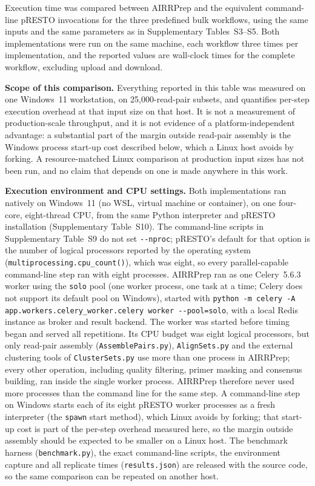 \documentclass[11pt]{article}
\begin{document}
Execution time was compared between AIRRPrep and the equivalent command-line
pRESTO invocations for the three predefined bulk workflows, using the same
inputs and the same parameters as in Supplementary Tables~S3--S5. Both
implementations were run on the same machine, each workflow three times per
implementation, and the reported values are wall-clock times for the complete
workflow, excluding upload and download.

\textbf{Scope of this comparison.} Everything reported in this table was
measured on one Windows~11 workstation, on 25,000-read-pair subsets, and
quantifies per-step execution overhead at that input size on that host. It is
not a measurement of production-scale throughput, and it is not evidence of a
platform-independent advantage: a substantial part of the margin outside
read-pair assembly is the Windows process start-up cost described below, which
a Linux host avoids by forking. A resource-matched Linux comparison at
production input sizes has not been run, and no claim that depends on one is
made anywhere in this work.

\textbf{Execution environment and CPU settings.} Both implementations ran
natively on Windows~11 (no WSL, virtual machine or container), on one
four-core, eight-thread CPU, from the same Python interpreter and pRESTO
installation (Supplementary Table~S10). The command-line scripts in
Supplementary Table~S9 do not set \texttt{-{}-nproc}; pRESTO's default for that
option is the number of logical processors reported by the operating system
(\texttt{multiprocessing.cpu\_count()}), which was eight, so every
parallel-capable command-line step ran with eight processes. AIRRPrep ran as one
Celery~5.6.3 worker using the \texttt{solo} pool (one worker process, one task at
a time; Celery does not support its default pool on Windows), started with
\texttt{python -m celery -A app.workers.celery\_worker.celery worker
-{}-pool=solo}, with a local Redis instance as broker and result backend. The
worker was started before timing began and served all repetitions. Its CPU
budget was eight logical processors, but only read-pair assembly
(\texttt{AssemblePairs.py}), \texttt{AlignSets.py} and the external clustering
tools of \texttt{ClusterSets.py} use more than one process in AIRRPrep; every
other operation, including quality filtering, primer masking and consensus
building, ran inside the single worker process. AIRRPrep therefore never used
more processes than the command line for the same step. A command-line step on
Windows starts each of its eight pRESTO worker processes as a fresh interpreter
(the \texttt{spawn} start method), which Linux avoids by forking; that start-up
cost is part of the per-step overhead measured here, so the margin outside
assembly should be expected to be smaller on a Linux host. The benchmark harness
(\texttt{benchmark.py}), the exact command-line scripts, the environment
capture and all replicate times (\texttt{results.json}) are released with the
source code, so the same comparison can be repeated on another host.
\end{document}
